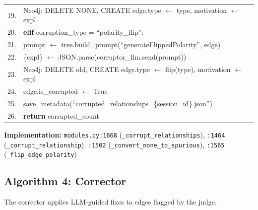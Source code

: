 \begin{table}[H]
\begin{tabular}{@{}r l@{}}
19. & \quad\quad Neo4j: DELETE NONE, CREATE edge.type $\leftarrow$ type, motivation $\leftarrow$ expl \\
20. & \quad \textbf{elif} corruption\_type = ``polarity\_flip'': \\
21. & \quad\quad prompt $\leftarrow$ tree.build\_prompt(``generateFlippedPolarity'', edge) \\
22. & \quad\quad \{expl\} $\leftarrow$ JSON.parse(corruptor\_llm.send(prompt)) \\
23. & \quad\quad Neo4j: DELETE old, CREATE edge.type $\leftarrow$ flip(type), motivation $\leftarrow$ expl \\
24. & \quad edge.is\_corrupted $\leftarrow$ True \\
25. & save\_metadata(``corrupted\_relationships\_\{session\_id\}.json'') \\
26. & \textbf{return} corrupted\_count \\
\bottomrule
\end{tabular}
\end{table}

\textbf{Implementation:} \texttt{modules.py:1668} (\texttt{\_corrupt\_relationships}), \texttt{:1464} (\texttt{\_corrupt\_relationship}), \texttt{:1502} (\texttt{\_convert\_none\_to\_spurious}), \texttt{:1565} (\texttt{\_flip\_edge\_polarity})

\subsection{Algorithm 4: Corrector}
\label{alg:corrector}

The corrector applies LLM-guided fixes to edges flagged by the judge.


